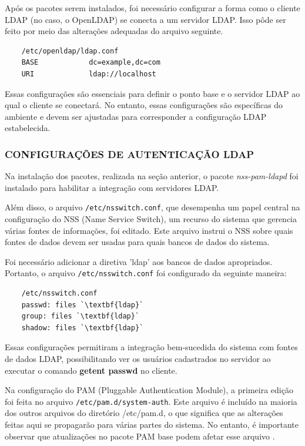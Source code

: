 Após os pacotes serem instalados, foi necessário configurar a forma como o cliente LDAP (no caso, o OpenLDAP) se conecta a um servidor LDAP. Isso pôde ser feito por meio das alterações adequadas do arquivo seguinte.

\begin{lstlisting}
    /etc/openldap/ldap.conf
    BASE            dc=example,dc=com
    URI             ldap://localhost
\end{lstlisting}

Essas configurações são essenciais para definir o ponto base e o servidor LDAP ao qual o cliente se conectará. No entanto, essas configurações são específicas do ambiente e devem ser ajustadas para corresponder a configuração LDAP estabelecida.

\subsubsection{CONFIGURAÇÕES DE AUTENTICAÇÃO LDAP}

Na instalação dos pacotes, realizada na seção anterior, o pacote \textit{nss-pam-ldapd} foi instalado para habilitar a integração com servidores LDAP. 

Além disso, o arquivo \verb|/etc/nsswitch.conf|, que desempenha um papel central na configuração do NSS (Name Service Switch), um recurso do sistema que gerencia várias fontes de informações, foi editado. Este arquivo instrui o NSS sobre quais fontes de dados devem ser usadas para quais bancos de dados do sistema.

Foi necessário adicionar a diretiva 'ldap' aos bancos de dados apropriados. Portanto, o arquivo \verb|/etc/nsswitch.conf| foi configurado da seguinte maneira:

\begin{lstlisting}
    /etc/nsswitch.conf
    passwd: files `\textbf{ldap}`
    group: files `\textbf{ldap}`
    shadow: files `\textbf{ldap}`
\end{lstlisting}

Essas configurações permitiram a integração bem-sucedida do sistema com fontes de dados LDAP, possibilitando ver os usuários cadastrados no servidor ao executar o comando \textbf{getent passwd} no cliente.

Na configuração do PAM (Pluggable Authentication Module), a primeira edição foi feita no arquivo \verb|/etc/pam.d/system-auth|. Este arquivo é incluído na maioria dos outros arquivos do diretório /etc/pam.d, o que significa que as alterações feitas aqui se propagarão para várias partes do sistema. No entanto, é importante observar que atualizações no pacote PAM base podem afetar esse arquivo \cite{archlinux}.

